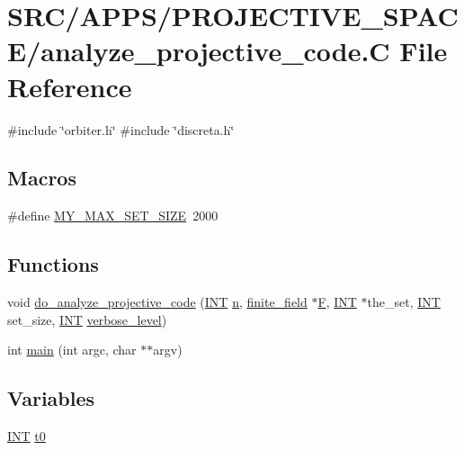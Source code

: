 \hypertarget{analyze__projective__code_8_c}{}\section{S\+R\+C/\+A\+P\+P\+S/\+P\+R\+O\+J\+E\+C\+T\+I\+V\+E\+\_\+\+S\+P\+A\+C\+E/analyze\+\_\+projective\+\_\+code.C File Reference}
\label{analyze__projective__code_8_c}
{\ttfamily \#include \char`\"{}orbiter.\+h\char`\"{}}\newline
{\ttfamily \#include \char`\"{}discreta.\+h\char`\"{}}\newline
\subsection*{Macros}
\begin{DoxyCompactItemize}
\item 
\#define \mbox{\hyperlink{analyze__projective__code_8_c_a1aea137e637de21dfaed317cd0d1f949}{M\+Y\+\_\+\+M\+A\+X\+\_\+\+S\+E\+T\+\_\+\+S\+I\+ZE}}~2000
\end{DoxyCompactItemize}
\subsection*{Functions}
\begin{DoxyCompactItemize}
\item 
void \mbox{\hyperlink{analyze__projective__code_8_c_a9702741fe6417c83d726635bdebf3bcb}{do\+\_\+analyze\+\_\+projective\+\_\+code}} (\mbox{\hyperlink{galois_8h_a09fddde158a3a20bd2dcadb609de11dc}{I\+NT}} \mbox{\hyperlink{simeon_8_c_a7f2cd26777ce0ff3fdaf8d02aacbddfb}{n}}, \mbox{\hyperlink{classfinite__field}{finite\+\_\+field}} $\ast$\mbox{\hyperlink{simeon_8_c_a21a61c535ff7d9d4b674461d3b19fffa}{F}}, \mbox{\hyperlink{galois_8h_a09fddde158a3a20bd2dcadb609de11dc}{I\+NT}} $\ast$the\+\_\+set, \mbox{\hyperlink{galois_8h_a09fddde158a3a20bd2dcadb609de11dc}{I\+NT}} set\+\_\+size, \mbox{\hyperlink{galois_8h_a09fddde158a3a20bd2dcadb609de11dc}{I\+NT}} \mbox{\hyperlink{simeon_8_c_a818073fbcc2f439e7c56952f67386122}{verbose\+\_\+level}})
\item 
int \mbox{\hyperlink{analyze__projective__code_8_c_a3c04138a5bfe5d72780bb7e82a18e627}{main}} (int argc, char $\ast$$\ast$argv)
\end{DoxyCompactItemize}
\subsection*{Variables}
\begin{DoxyCompactItemize}
\item 
\mbox{\hyperlink{galois_8h_a09fddde158a3a20bd2dcadb609de11dc}{I\+NT}} \mbox{\hyperlink{analyze__projective__code_8_c_a4268f4fe222ffb119218a0199f5e1904}{t0}}
\end{DoxyCompactItemize}


